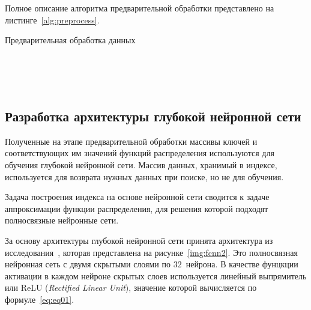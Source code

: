 Полное описание алгоритма предварительной обработки представлено на
листинге~\ref{alg:preprocess}.

\begin{algorithm}
    \caption{Предварительная обработка данных ~~~~~~~~~~~~~~~~~~~~}
    \label{alg:preprocess}
    \small


\end{algorithm}

~\\
~\\
~\\
\subsection{Разработка архитектуры глубокой нейронной сети}

Полученные на этапе предварительной обработки массивы ключей и соответствующих
им значений функций распределения используются для обучения глубокой нейронной
сети. Массив данных, хранимый в индексе, используется для возврата нужных
данных при поиске, но не для обучения.

Задача построения индекса на основе нейронной сети сводится к задаче
аппроксимации функции распределения, для решения которой подходят полносвязные
нейронные сети.

За основу архитектуры глубокой нейронной сети принята архитектура из
исследования~\cite{main}, которая представлена на рисунке~\ref{img:fcnn2}.  Это
полносвязная нейронная сеть с двумя скрытыми слоями по 32~нейрона.  В качестве
фунцкции активации в каждом нейроне скрытых слоев используется линейный
выпрямитель или ReLU (\textit{Rectified Linear Unit}), значение которой
вычисляется по формуле~\ref{eq:eq01}.

